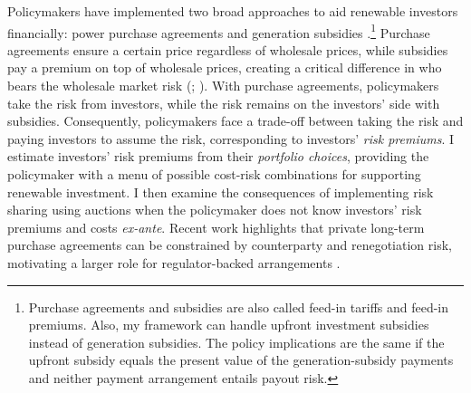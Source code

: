 \documentclass[12pt]{article}
\theoremstyle{definition} %
\begin{document}


Policymakers have implemented two broad approaches to aid renewable investors financially: power purchase agreements and generation subsidies \citep{IRENA2019}.\footnote{
Purchase agreements and subsidies are also called feed-in tariffs and feed-in premiums. Also, my framework can handle upfront investment subsidies instead of generation subsidies. The policy implications are the same if the upfront subsidy equals the present value of the generation-subsidy payments and neither payment arrangement entails payout risk.
} Purchase agreements ensure a certain price regardless of wholesale prices, while subsidies pay a premium on top of wholesale prices, creating a critical difference in who bears the wholesale market risk (\citealp{Farrell2017}; \citealp*{Alcorta2023}). With purchase agreements, policymakers take the risk from investors, while the risk remains on the investors' side with subsidies. Consequently, policymakers face a trade-off between taking the risk and paying investors to assume the risk, corresponding to investors' \textit{risk premiums}. I estimate investors' risk premiums from their \textit{portfolio choices}, providing the policymaker with a menu of possible cost-risk combinations for supporting renewable investment. I then examine the consequences of implementing risk sharing using auctions when the policymaker does not know investors' risk premiums and costs \textit{ex-ante}. Recent work highlights that private long-term purchase agreements can be constrained by counterparty and renegotiation risk, motivating a larger role for regulator-backed arrangements \citep{Fabra2025a,Fabra2025b}.
\end{document}

